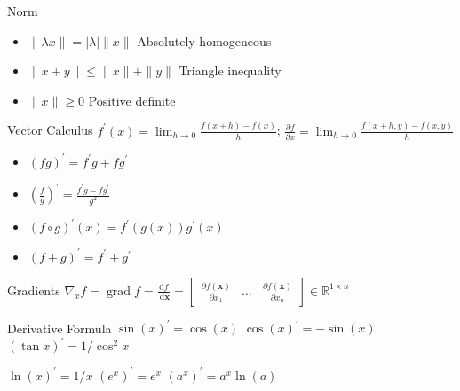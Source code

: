 \documentclass[UTF8,a4paper]{article}
\begin{document}
\begin{cheatsheetblock}{Norm}
    \begin{itemize}
        \item $\|\lambda x\|=|\lambda| \|x\|$ \hfill Absolutely homogeneous
        \item $\|x+y\| \leq\|x\|+\|y\|$ \hfill Triangle inequality
        \item $\|x\| \geq 0$ \hfill Positive definite
    \end{itemize}
\end{cheatsheetblock}

\begin{cheatsheetblock} {Vector Calculus}
    $f^{\prime}(x)=\lim _{h \rightarrow 0} \frac{f(x+h)-f(x)}{h}$; \hfill $\frac{\partial f}{\partial x}=\lim _{h \rightarrow 0} \frac{f(x+h, y)-f(x, y)}{h}$

    \begin{itemize}
        \item $(f g)^{\prime}=f^{\prime} g+f g^{\prime}$ \hfill {}
        \item $\left(\frac{f}{g}\right)^{\prime}=\frac{f^{\prime} g-f g^{\prime}}{g^{2}}$ \hfill {}
        \item $(f \circ g)^{\prime}(x)=f^{\prime}(g(x)) g^{\prime}(x)$ \hfill {}
        \item $(f+g)^{\prime}=f^{\prime}+g^{\prime}$ \hfill {}
    \end{itemize}
\end{cheatsheetblock}

\begin{cheatsheetblock}{Gradients}
    $        \nabla_x f=\operatorname{grad} f=\frac{\mathrm{d} f}{\mathrm{~d} \boldsymbol{x}}=\left[\begin{array}{lll}
                \frac{\partial f(\boldsymbol{x})}{\partial x_1} & \ldots & \frac{\partial f(\boldsymbol{x})}{\partial x_n}
            \end{array}\right] \in \mathbb{R}^{1 \times n}$
\end{cheatsheetblock}

\begin{cheatsheetblock}{Derivative Formula}
    $\sin(x)^{\prime}=\cos (x)$ \hfill $\cos (x)^{\prime}=-\sin (x)$ \hfill $(\tan x)^{\prime}=1 / \cos ^{2} x$

    $\ln (x)^{\prime}=1 / x$  \hfill $(e^{x})^{\prime}=e^{x}$ \hfill $(a^{x})^{\prime}=a^{x} \ln (a)$
\end{cheatsheetblock}
\end{document}
